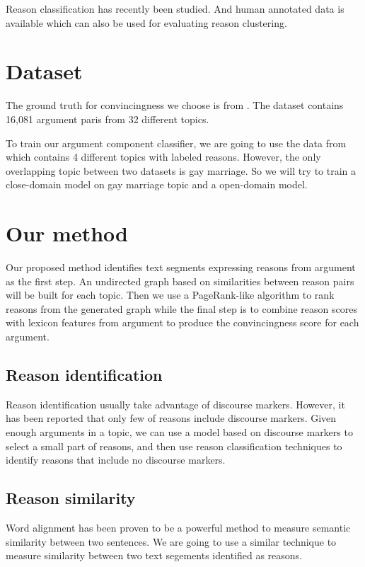 \documentclass[11pt,a4paper]{article}
\begin{document}
Reason classification has recently been studied\cite{hasan2014you}. And human annotated data is available which can also be used for evaluating reason clustering.

\section{Dataset}

The ground truth for convincingness we choose is from \cite{habernal2016argument}. The dataset contains 16,081 argument paris from 32 different topics. 

To train our argument component classifier, we are going to use the data from \cite{hasan2014you} which contains 4 different topics with labeled reasons. However, the only overlapping topic between two datasets is gay marriage. So we will try to train a close-domain model on gay marriage topic and a open-domain model. 

\section{Our method}

Our proposed method identifies text segments expressing reasons from argument as the first step. An undirected graph based on similarities between reason pairs will be built for each topic. Then we use a PageRank-like algorithm to rank reasons from the generated graph while the final step is to combine reason scores with lexicon features from argument to produce the convincingness score for each argument.  

\subsection{Reason identification}

Reason identification usually take advantage of discourse markers\cite{palau2009argumentation}. However, it has been reported that only few of reasons include discourse markers\cite{marcu2002unsupervised}. Given enough arguments in a topic, we can use a model based on discourse markers to select a small part of reasons, and then use reason classification techniques to identify reasons that include no discourse markers.

\subsection{Reason similarity}

Word alignment has been proven to be a powerful method to measure semantic similarity between two sentences\cite{sultan2015dls}. We are going to use a similar technique to measure similarity between two text segements identified as reasons.
\end{document}
